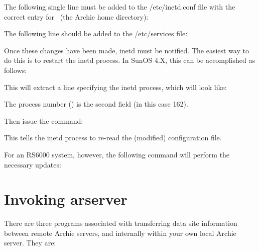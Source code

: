 


The following single line must be added to the /etc/inetd.conf file with the
correct entry for \Archie \  (the Archie home directory):


The following line should be added to the /etc/services file:








Once these changes have been made, inetd must be notified. The easiest way to
do this is to restart the inetd process. In SunOS 4.X, this can be
accomplished as follows:


This will extract a line specifying the inetd process, which will look like:





The process number () is the second field (in this case 162). 



Then issue the command:


This tells the inetd process to re-read the (modified) configuration file.

For an RS6000 system, however, the following command will perform the necessary updates:



\section{Invoking arserver}

There are three programs associated with transferring data site information
between remote Archie servers, and internally within your own local Archie
server. They are:

